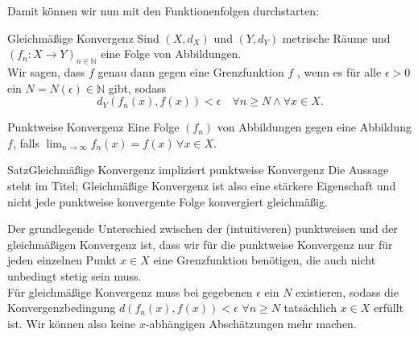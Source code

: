 Damit können wir nun mit den Funktionenfolgen durchstarten:
\begin{Def}
{Gleichmäßige Konvergenz}
Sind $(X,d_X)$ und $(Y,d_Y)$ metrische Räume und $(f_n:X\to Y)_{n\in\mathbb{N}}$ eine Folge von Abbildungen.\\
Wir sagen, dass $f$ genau dann  gegen eine Grenzfunktion $f$ , wenn es für alle $\epsilon>0$ ein $N=N(\epsilon)\in\mathbb{N}$ gibt, sodass
\begin{equation*}
    d_Y(f_n(x),f(x))<\epsilon\quad \forall n\geq N\land \forall x\in X.
\end{equation*}
\end{Def}
\begin{Def}
{Punktweise Konvergenz}
Eine Folge $(f_n)$ von Abbildungen  gegen eine Abbildung $f$, falls $\lim_{n\to\infty}f_n(x)=f(x)\,\forall x\in X$.
\end{Def}
\begin{Satz}
{Satz}{Gleichmäßige Konvergenz impliziert punktweise Konvergenz}
Die Aussage steht im Titel; Gleichmäßige Konvergenz ist also eine stärkere Eigenschaft und nicht jede punktweise konvergente Folge konvergiert gleichmäßig.
\end{Satz}
Der grundlegende Unterschied zwischen der (intuitiveren) punktweisen und der gleichmäßigen Konvergenz ist, dass wir für die punktweise Konvergenz nur für jeden einzelnen Punkt $x\in X$ eine Grenzfunktion benötigen, die auch nicht unbedingt stetig sein muss.\\
Für gleichmäßige Konvergenz muss bei gegebenen $\epsilon$ ein $N$ existieren, sodass die Konvergenzbedingung $d(f_n(x),f(x))<\epsilon$ $\forall n\geq N$ tatsächlich  $x\in X$ erfüllt ist. Wir können also keine $x$-abhängigen Abschätzungen mehr machen.\\
